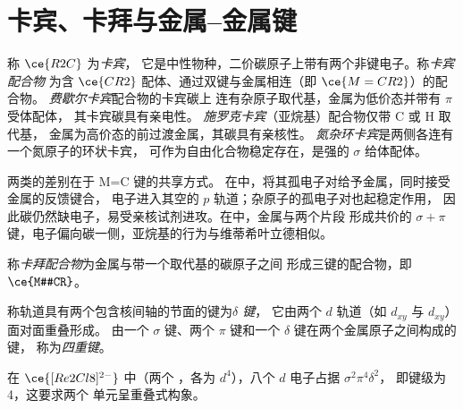 \section{卡宾、卡拜与金属–金属键}

\begin{definition}[卡宾与卡宾配合物]\label{def:b3:organometallic-bonding:carbene}
称 $\ce{R2C}$ 为\emph{卡宾}，
它是中性物种，二价碳原子上带有两个非键电子。称\emph{卡宾配合物}
为含 $\ce{CR2}$ 配体、通过双键与金属相连（即 $\ce{M=CR2}$）的配合物。
\emph{费歇尔卡宾}配合物的卡宾碳上
连有杂原子取代基，金属为低价态并带有 $\pi$ 受体配体，
其卡宾碳具有亲电性。
\emph{施罗克卡宾}（亚烷基）配合物仅带 C 或 H 取代基，
金属为高价态的前过渡金属，其碳具有亲核性。
\emph{氮杂环卡宾}是两侧各连有一个氮原子的环状卡宾，
可作为自由化合物稳定存在，是强的 $\sigma$ 给体配体。
\end{definition}

两类的差别在于 M=C 键的共享方式。
在中，将其孤电子对给予金属，同时接受金属的反馈键合，
电子进入其空的 $p$ 轨道；杂原子的孤电子对也起稳定作用，
因此碳仍然缺电子，易受亲核试剂进攻。在中，金属与两个片段
形成共价的 $\sigma +
\pi$ 键，电子偏向碳一侧，亚烷基的行为与维蒂希叶立德相似。

\begin{definition}[卡拜配合物]\label{def:b3:organometallic-bonding:carbyne}
称\emph{卡拜配合物}为金属与带一个取代基的碳原子之间
形成三键的配合物，即 $\ce{M#CR}$。
\end{definition}

\begin{definition}\label{def:b3:organometallic-bonding:delta}
称轨道具有两个包含核间轴的节面的键为\emph{$\delta$ 键}，
它由两个 $d$ 轨道（如 $d_{xy}$ 与 $d_{xy}$）面对面重叠形成。
由一个 $\sigma$ 键、两个 $\pi$ 键和一个 $\delta$ 键在两个金属原子之间构成的键，
称为\emph{四重键}。
\end{definition}

\begin{proposition}\label{prop:b3:organometallic-bonding:quadruple}
在 $\ce{[Re2Cl8]^{2-}}$ 中（两个 ，各为 $d^4$），八个 $d$ 电子占据 $\sigma^2\pi^4\delta^2$，
即键级为 4，这要求两个  单元呈重叠式构象。
\end{proposition}


